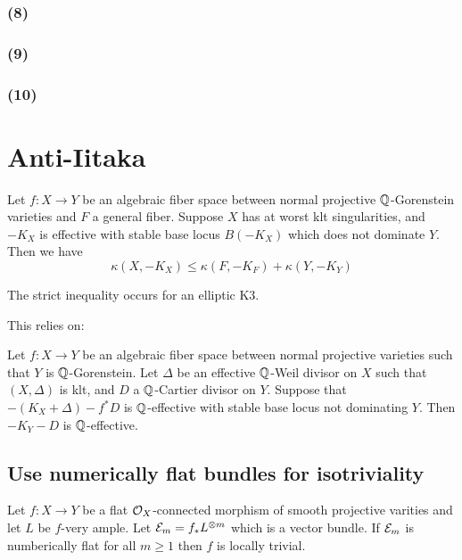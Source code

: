\documentclass[12pt]{article}
\begin{document}
\subsubsection{(8)}


\subsubsection{(9)}


\subsubsection{(10)}


 
\section{Anti-Iitaka}

\begin{theorem}
Let $f : X \to Y$ be an algebraic fiber space between normal projective $\mathbb{Q}$-Gorenstein varieties and $F$ a general fiber. Suppose $X$ has at worst klt singularities, and $-K_X$ is effective with stable base locus $B(-K_X)$ which does not dominate $Y$. Then we have
\[ \kappa(X, -K_X) \le \kappa(F, -K_F) + \kappa(Y, -K_Y) \]
\end{theorem}

\begin{rmk}
The strict inequality occurs for an elliptic K3. 
\end{rmk}

This relies on:

\begin{theorem}
Let $f : X \to Y$ be an algebraic fiber space between normal projective varieties such that $Y$ is $\mathbb{Q}$-Gorenstein. Let $\Delta$ be an effective $\mathbb{Q}$-Weil divisor on $X$ such that $(X, \Delta)$ is klt, and $D$ a $\mathbb{Q}$-Cartier divisor on $Y$. Suppose that $-(K_X + \Delta) - f^* D$ is $\mathbb{Q}$-effective with stable base locus not dominating $Y$. Then $-K_Y - D$ is $\mathbb{Q}$-effective.
\end{theorem}

\subsection{Use numerically flat bundles for isotriviality}

\begin{lemma}
Let $f : X \to Y$ be a flat $\mathcal{O}_{X}$-connected morphism of smooth projective varities and let $L$ be $f$-very ample. Let $\mathcal{E}_m = f_* L^{\otimes m}$ which is a vector bundle. If $\mathcal{E}_m$ is numberically flat for all $m \ge 1$ then $f$ is locally trivial.  
\end{lemma}
\end{document}
